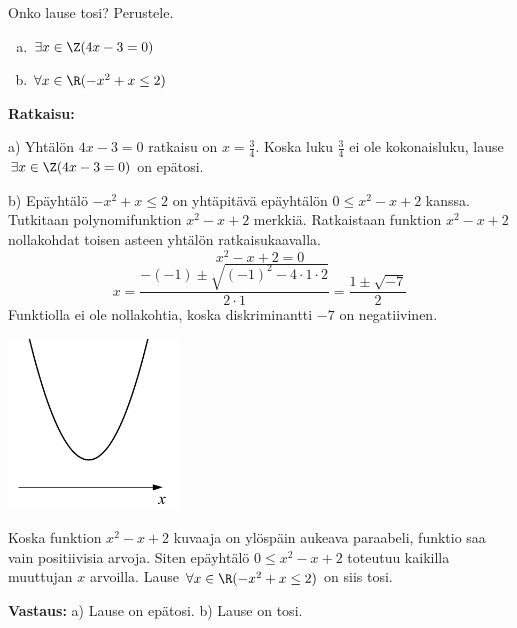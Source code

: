 \begin{esimerkki}
Onko lause tosi? Perustele.
\begin{enumerate}[a)]
\item $\exists x\in \Z(4x - 3 = 0)$
\item $\forall x\in \R(-x^2 + x \le 2)$
\end{enumerate}

{\bf Ratkaisu:}

a) Yhtälön $4x - 3 = 0$ ratkaisu on $x = \frac{3}{4}$. Koska luku $\frac{3}{4}$ ei ole kokonaisluku, lause $\exists x\in \Z(4x - 3 = 0)$ on epätosi.

b) Epäyhtälö $-x^2+x \le 2$ on yhtäpitävä epäyhtälön $0 \le x^2 - x + 2$ kanssa. Tutkitaan polynomifunktion $x^2 - x + 2$ merkkiä. Ratkaistaan funktion $x^2 - x + 2$ nollakohdat toisen asteen yhtälön ratkaisukaavalla.
\[
x^2 - x + 2 = 0
\]
\[
x=\frac{-(-1) \pm \sqrt{(-1)^2 -4\cdot 1 \cdot 2}}{2 \cdot 1}=\frac{1 \pm \sqrt{-7}}{2}
\]
Funktiolla ei ole nollakohtia, koska diskriminantti $-7$ on negatiivinen. 

\bigskip

\begin{center}
\includegraphics[width=4.5cm]{pictures/kpl3_3_paraabeli}
\end{center}

Koska funktion $x^2 - x + 2$ kuvaaja on ylöspäin aukeava paraabeli, funktio saa vain positiivisia arvoja. Siten epäyhtälö $0 \le x^2 - x + 2$ toteutuu kaikilla muuttujan $x$ arvoilla. Lause $\forall x\in \R(-x^2 + x \le 2)$ on siis tosi.

{\bf Vastaus:} a) Lause on epätosi. b) Lause on tosi.
\end{esimerkki}

